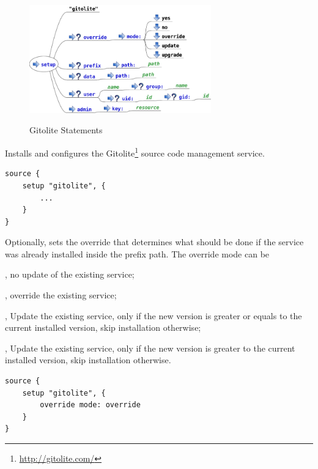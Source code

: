 \begin{figure}[htp]
\centering
\includegraphics[width=0.7\textwidth]{source_setup_gitolite}
\label{fig:source_setup_gitolite}
\caption{Gitolite Statements}
\end{figure}


Installs and configures the Gitolite\footnote{\url{http://gitolite.com/}} 
source code management service.

\begin{lstlisting}[style=Java]
source {
    setup "gitolite", {
        ...
    }
}
\end{lstlisting}


Optionally, sets the override  that determines what should be done if the
service was already installed inside the prefix path. The override mode can be
\begin{compactitem}
\item {}, no update of the existing service;
\item {}, override the existing service;
\item {}, Update the existing service, only if the 
new version is greater or equals to the current installed version, 
skip installation otherwise;
\item {}, Update the existing service, only if the 
new version is greater to the current installed version, 
skip installation otherwise.
\end{compactitem}

\begin{lstlisting}[style=Java]
source {
    setup "gitolite", {
        override mode: override
    }
}
\end{lstlisting}

